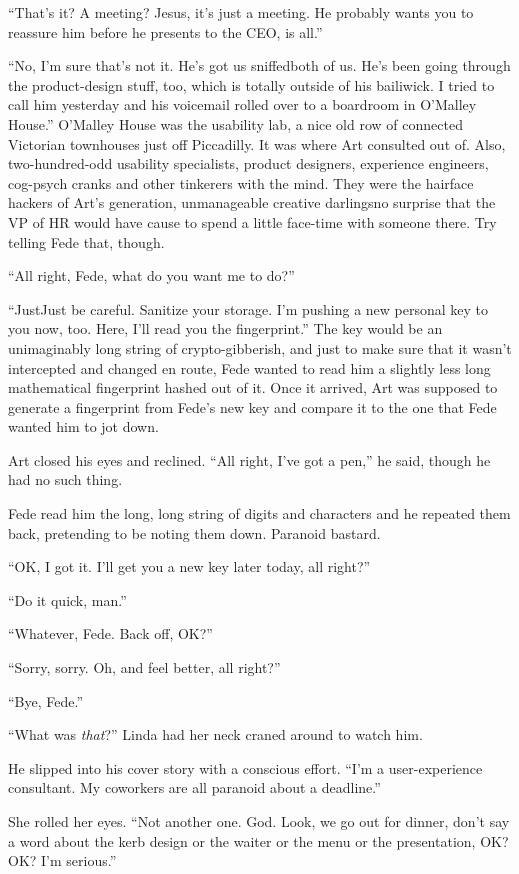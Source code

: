 “That’s it? A meeting? Jesus, it’s just a meeting. He probably
wants you to reassure him before he presents to the CEO, is all.”

“No, I’m sure that’s not it. He’s got us sniffed{\dash}both of us. He’s
been going through the product-design stuff, too, which is totally
outside of his bailiwick. I tried to call him yesterday and his
voicemail rolled over to a boardroom in O’Malley House.” O’Malley
House was the usability lab, a nice old row of connected Victorian
townhouses just off Piccadilly. It was where Art consulted out of.
Also, two-hundred-odd usability specialists, product designers,
experience engineers, cog-psych cranks and other tinkerers with the
mind. They were the hairface hackers of Art’s generation,
unmanageable creative darlings{\dash}no surprise that the VP of HR would
have cause to spend a little face-time with someone there. Try
telling Fede that, though.

“All right, Fede, what do you want me to do?”

“Just{\dash}Just be careful. Sanitize your storage. I’m pushing a new
personal key to you now, too. Here, I’ll read you the fingerprint.”
The key would be an unimaginably long string of crypto-gibberish,
and just to make sure that it wasn’t intercepted and changed en
route, Fede wanted to read him a slightly less long mathematical
fingerprint hashed out of it. Once it arrived, Art was supposed to
generate a fingerprint from Fede’s new key and compare it to the
one that Fede wanted him to jot down.

Art closed his eyes and reclined. “All right, I’ve got a pen,” he
said, though he had no such thing.

Fede read him the long, long string of digits and characters and he
repeated them back, pretending to be noting them down. Paranoid
bastard.

“OK, I got it. I’ll get you a new key later today, all right?”

“Do it quick, man.”

“Whatever, Fede. Back off, OK?”

“Sorry, sorry. Oh, and feel better, all right?”

“Bye, Fede.”

“What was \emph{that}?” Linda had her neck craned around to watch
him.

He slipped into his cover story with a conscious effort. “I’m a
user-experience consultant. My coworkers are all paranoid about a
deadline.”

She rolled her eyes. “Not another one. God. Look, we go out for
dinner, don’t say a word about the kerb design or the waiter or the
menu or the presentation, OK? OK? I’m serious.”


